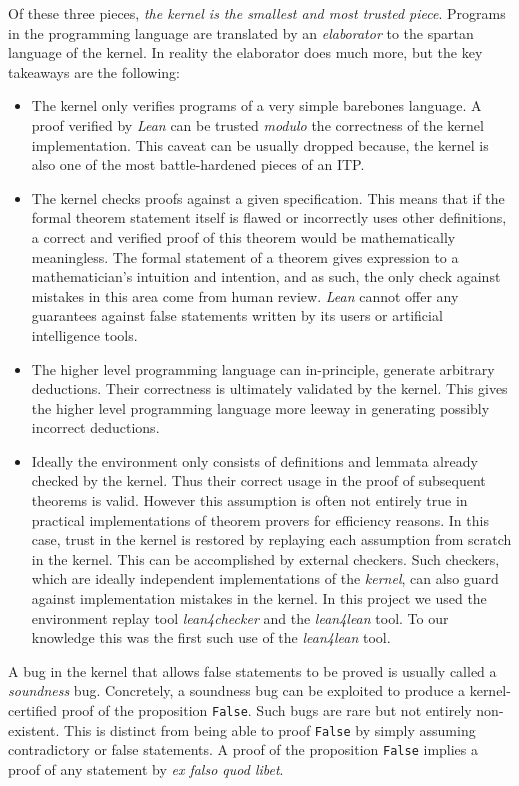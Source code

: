 Of these three pieces, \emph{the kernel is the smallest and most trusted piece}. Programs in the programming language are translated by an \emph{elaborator} to the spartan language of the kernel. In reality the elaborator does much more, but the key takeaways are the following:
\begin{itemize}
    \item The kernel only verifies programs of a very simple barebones language. A proof verified by \emph{Lean} can be trusted \emph{modulo} the correctness of the kernel implementation. This caveat can be usually dropped because, the kernel is also one of the most battle-hardened pieces of an ITP.
    \item The kernel checks proofs against a given specification. This means that if the formal theorem statement itself is flawed or incorrectly uses other definitions, a correct and verified proof of this theorem would be mathematically meaningless. The formal statement of a theorem gives expression to a mathematician's intuition and intention, and as such, the only check against mistakes in this area come from human review. \emph{Lean} cannot offer any guarantees against false statements written by its users or artificial intelligence tools.
    \item The higher level programming language can in-principle, generate arbitrary deductions. Their correctness is ultimately validated by the kernel. This gives the higher level programming language more leeway in generating possibly incorrect deductions.
    \item Ideally the environment only consists of definitions and lemmata already checked by the kernel. Thus their correct usage in the proof of subsequent theorems is valid. However this assumption is often not entirely true in practical implementations of theorem provers for efficiency reasons. In this case, trust in the kernel is restored by replaying each assumption from scratch in the kernel. This can be accomplished by external checkers. Such checkers, which are ideally independent implementations of the \emph{kernel}, can also guard against implementation mistakes in the kernel. In this project we used the environment replay tool \textit{lean4checker} and the \textit{lean4lean} \cite{lean4lean} tool. To our knowledge this was the first such use of the \textit{lean4lean} tool.

\end{itemize}

\begin{remark}
    A bug in the kernel that allows false statements to be proved is usually called a \emph{soundness} bug. Concretely, a soundness bug can be exploited to produce a kernel-certified proof of the proposition \texttt{False}. Such bugs are rare but not entirely non-existent. This is distinct from being able to proof \texttt{False} by simply assuming contradictory or false statements. A proof of the proposition \texttt{False} implies a proof of any statement by \emph{ex falso quod libet}.
\end{remark}

